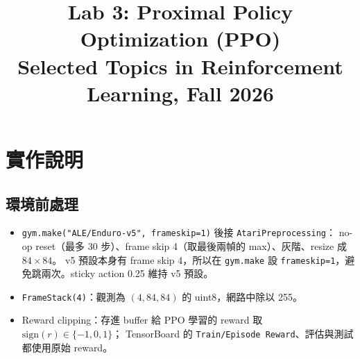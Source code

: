 \documentclass[11pt,a4paper]{article}
\title{\textbf{Lab 3: Proximal Policy Optimization (PPO)}\\[2pt]\large Selected Topics in Reinforcement Learning, Fall 2026}
\author{\studentid\quad \studentname}
\date{}
\begin{document}
\maketitle
\vspace{-1.5em}

\begin{center}
\end{center}

\section{實作說明}

\subsection{環境前處理}
\begin{itemize}[leftmargin=1.2em]
  \item \texttt{gym.make("ALE/Enduro-v5", frameskip=1)} 後接 \texttt{AtariPreprocessing}：
        no-op reset（最多 30 步）、frame skip 4（取最後兩幀的 max）、灰階、resize 成 $84\times84$。
        v5 預設本身有 frame skip 4，所以在 \texttt{gym.make} 設 \texttt{frameskip=1}，避免跳兩次。sticky action 0.25 維持 v5 預設。
  \item \texttt{FrameStack(4)}：觀測為 $(4, 84, 84)$ 的 uint8，網路中除以 255。
  \item Reward clipping：存進 buffer 給 PPO 學習的 reward 取 $\mathrm{sign}(r)\in\{-1,0,1\}$；
        TensorBoard 的 \texttt{Train/Episode Reward}、評估與測試都使用原始 reward。
\end{itemize}
\end{document}
